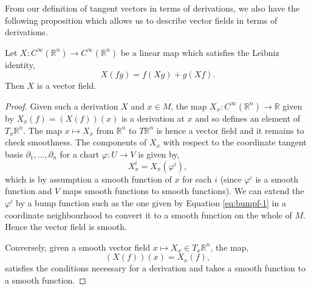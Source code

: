 From our definition of tangent vectors in terms of derivations, we also have the following proposition which allows us to describe vector fields in terms of derivations.
\begin{proposition}
Let $X:C^{\infty}(\mathbb{R}^n)\to C^{\infty}(\mathbb{R}^n)$ be a linear map which satisfies the Leibniz identity,
\[
X(fg)=f(Xg)+g(Xf).
\]
Then $X$ is a vector field.
\end{proposition}
\begin{proof}
Given such a derivation $X$ and $x\in M$, the map $X_x:C^{\infty}(\mathbb{R}^n)\to\mathbb{R}$ given by $X_x(f)=(X(f))(x)$ is a derivation at $x$ and so defines an element of $T_x\mathbb{R}^n$. The map $x\mapsto X_x$ from $\mathbb{R}^n$ to $T\mathbb{R}^n$ is hence a vector field and it remains to check smoothness. The components of $X_x$ with respect to the coordinate tangent basis $\partial_1,\ldots,\partial_n$ for a chart $\varphi:U\to V$ is given by,
\[
X_x^i=X_x(\varphi^i),
\]
which is by assumption a smooth function of $x$ for each $i$ (since $\varphi^i$ is a smooth function and $V$ maps smooth functions to smooth functions). We can extend the $\varphi^i$ by a bump function such as the one given by Equation \eqref{eq:bumpf-1} in a coordinate neighbourhood to convert it to a smooth function on the whole of $M$. Hence the vector field is smooth.

Conversely, given a smooth vector field $x\mapsto X_x\in T_x\mathbb{R}^n$, the map,
\[
(X(f))(x)=X_x(f),
\] 
satisfies the conditions necessary for a derivation and takes a smooth function to a smooth function.
%
\end{proof}

